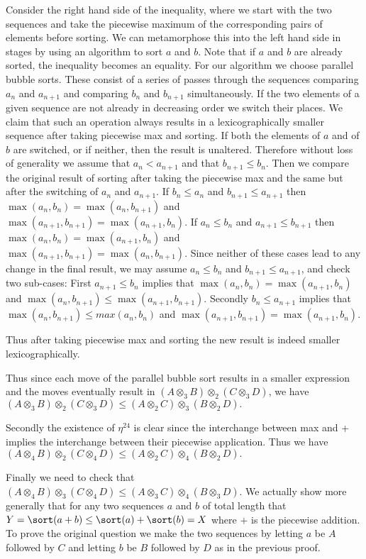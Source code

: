 \documentclass{tac}
\begin{document}
{\begin{enumerate}
Consider the right hand side of the inequality, where we start with the two sequences and take the 
piecewise maximum of the corresponding pairs of elements before sorting. We can metamorphose this
into the left hand side in stages by using an algorithm to sort $a$ and $b$. Note that if $a$ and $b$ are
already sorted, the inequality becomes an equality.
For our algorithm we choose parallel bubble sorts. These consist
of a series of passes through the sequences comparing $a_n$ and $a_{n+1}$ and  comparing $b_n$ and $b_{n+1}$
simultaneously. If the two elements of a given sequence are not already in decreasing order we 
switch their places. We claim that such an operation always results in a lexicographically smaller
sequence after taking piecewise max and sorting. If both the elements of $a$ and of $b$ are switched, or if neither,
then the result is unaltered. Therefore without loss of generality we assume that $a_n < a_{n+1}$
and that $b_{n+1} \le b_n.$ Then we compare the original
result of sorting after taking the piecewise max and the same but after the switching of $a_n$ and
$a_{n+1}.$ If $b_n \le a_n$ and $b_{n+1} \le a_{n+1}$ then 
$\max(a_n,b_n) = \max(a_n, b_{n+1})$ and $\max(a_{n+1}, b_{n+1}) = \max(a_{n+1}, b_n).$ If $a_n \le b_n$ 
and $a_{n+1} \le b_{n+1}$  then
$\max(a_n,b_n) = \max(a_{n+1}, b_n)$ and $\max(a_{n+1}, b_{n+1}) = \max(a_n, b_{n+1}).$
 Since neither of these cases lead to any change in the final result,
 we may assume $a_n \le b_n$ and $b_{n+1} \le a_{n+1}$, and check two sub-cases:
First $a_{n+1} \le b_n$ implies that
$\max(a_n,b_n) = \max(a_{n+1}, b_n)$ and $\max(a_n, b_{n+1}) \le \max(a_{n+1}, b_{n+1}).$ Secondly $b_n \le a_{n+1}$
implies that $\max(a_n, b_{n+1}) \le max(a_n,b_n)$ and $\max(a_{n+1}, b_{n+1}) = \max(a_{n+1}, b_n).$ 

Thus after taking piecewise max
and sorting the new result is indeed smaller lexicographically. 

Thus since each move of the parallel bubble sort results in a smaller expression  and the moves
eventually result in $(A \otimes_3 B)\otimes_2(C \otimes_3 D)$, we have $(A \otimes_3 B)\otimes_2(C \otimes_3 D) \le (A \otimes_2 C)\otimes_3 (B \otimes_2 D).$  
  
Secondly the existence of $\eta^{24}$ is clear since the interchange between max and + implies the interchange between 
their piecewise application. Thus we have $(A \otimes_4 B)\otimes_2(C \otimes_4 D) \le (A \otimes_2 C)\otimes_4 (B \otimes_2 D).$
      
   
Finally we need to check that $(A \otimes_4 B)\otimes_3(C \otimes_4 D) \le(A \otimes_3 C)\otimes_4 (B \otimes_3 D).$  
We actually show more generally that for any two sequences $a$ and $b$ of total length
that $Y= \sort(a+b)\le \sort(a)+\sort(b) =X$ where $+$ is the piecewise addition.
To prove the original question we make the two sequences by letting $a$ be $A$ followed by 
$C$ and letting $b$ be $B$ followed by $D$ as in the previous proof.


\end{enumerate}}
\end{document}

